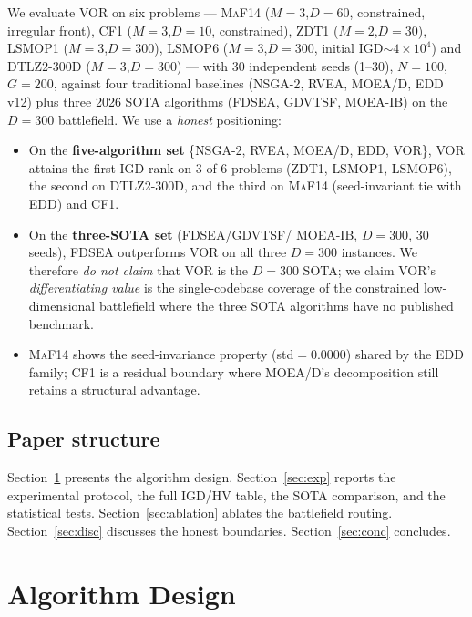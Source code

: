 \documentclass[preprint,12pt]{elsarticle}
\begin{document}
We evaluate VOR on six problems --- \textsc{MaF14} ($M=3$,$D=60$,
constrained, irregular front), \textsc{CF1} ($M=3$,$D=10$, constrained),
\textsc{ZDT1} ($M=2$,$D=30$), \textsc{LSMOP1} ($M=3$,$D=300$),
\textsc{LSMOP6} ($M=3$,$D=300$, initial IGD$\sim 4\times10^4$) and
\textsc{DTLZ2}-300D ($M=3$,$D=300$) --- with 30 independent seeds
(1--30), $N=100$, $G=200$, against four traditional baselines
(\textsc{NSGA-2}, \textsc{RVEA}, \textsc{MOEA/D}, \textsc{EDD} v12) plus
three 2026 SOTA algorithms (\textsc{FDSEA}, \textsc{GDVTSF},
\textsc{MOEA-IB}) on the $D=300$ battlefield. We use a \emph{honest}
positioning:
\begin{itemize}
\item On the \textbf{five-algorithm set} \{\textsc{NSGA-2}, \textsc{RVEA},
  \textsc{MOEA/D}, \textsc{EDD}, \textsc{VOR}\}, VOR attains the first IGD
  rank on 3 of 6 problems (\textsc{ZDT1}, \textsc{LSMOP1}, \textsc{LSMOP6}),
  the second on \textsc{DTLZ2}-300D, and the third on \textsc{MaF14}
  (seed-invariant tie with \textsc{EDD}) and \textsc{CF1}.
\item On the \textbf{three-SOTA set} (\textsc{FDSEA}/\textsc{GDVTSF}/
  \textsc{MOEA-IB}, $D=300$, 30 seeds), \textsc{FDSEA} outperforms VOR on
  all three $D=300$ instances. We therefore \emph{do not claim} that VOR is
  the $D=300$ SOTA; we claim VOR's \emph{differentiating value} is the
  single-codebase coverage of the constrained low-dimensional battlefield
  where the three SOTA algorithms have no published benchmark.
\item \textsc{MaF14} shows the seed-invariance property (std$=0.0000$)
  shared by the EDD family; \textsc{CF1} is a residual boundary where
  MOEA/D's decomposition still retains a structural advantage.
\end{itemize}

\subsection{Paper structure}
Section~\ref{sec:algo} presents the algorithm design.
Section~\ref{sec:exp} reports the experimental protocol, the full IGD/HV
table, the SOTA comparison, and the statistical tests.
Section~\ref{sec:ablation} ablates the battlefield routing.
Section~\ref{sec:disc} discusses the honest boundaries.
Section~\ref{sec:conc} concludes.

\section{Algorithm Design}
\label{sec:algo}
\end{document}
